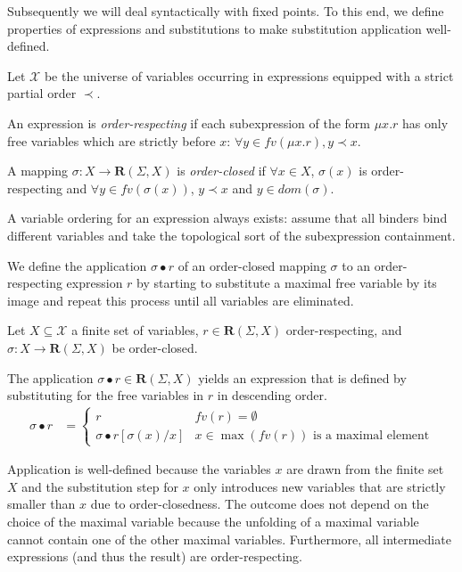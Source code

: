 \documentclass[runningheads, envcountsame, a4paper]{llncs}
\newcommand{\DOM}{{\textit{dom}}}
\newcommand\FV{{\textit{fv}}}
\newcommand\X{\mathcal{X}}
\newcommand\Reg{\mathbf{R}}
\newcommand\ApplySubst[2]{#1 \bullet #2} %
\begin{document}
Subsequently we will deal syntactically with fixed points. To this end,
we define properties of expressions and substitutions to make
substitution application well-defined.

\begin{definition}
  Let $\X$ be the universe of variables occurring in expressions
  equipped with a strict partial order $\prec$.

  An expression is \emph{order-respecting} if each subexpression
  of the form $\mu x.r$ has only free variables which are strictly before
  $x$: $\forall y\in\FV (\mu x.r), y \prec x$.

  A mapping $\sigma: X \to \Reg (\Sigma, X)$ is \emph{order-closed}
  if $\forall x\in X$, $\sigma (x)$ is order-respecting and
  $\forall y \in \FV(\sigma (x))$, $y\prec x$ and $y\in\DOM
  (\sigma)$. 
\end{definition}
A variable ordering for an expression always exists: assume that all
binders bind different variables and take the topological
sort of the subexpression containment.

We define the application $\ApplySubst\sigma r$ of an order-closed
mapping $\sigma$ to an order-respecting expression $r$ by starting 
to substitute a maximal free variable by its image and repeat this
process until all variables are eliminated.
\begin{definition}
  Let $X \subseteq \X$ a finite set of variables, $r \in \Reg (\Sigma,
  X)$ order-respecting, and $\sigma : X \to
  \Reg (\Sigma, X)$ be order-closed.

  The application $\ApplySubst \sigma r \in 
  \Reg (\Sigma, X)$ yields an expression that is
  defined by substituting for the free variables in $r$ in descending order.
  \begin{align*}
    \ApplySubst \sigma r &=
                           \begin{cases}
                             r & \FV (r) = \emptyset \\
                             \ApplySubst\sigma{r[\sigma(x)/x]}& x \in \max (\FV (r)) \text{ is a
                               maximal element}
                           \end{cases}
  \end{align*}
\end{definition}
Application is well-defined because the variables $x$ are drawn from
the finite set $X$ and the substitution step for $x$ only introduces
new variables that are strictly smaller than $x$ due to
order-closedness.
The outcome does not depend on the choice of the maximal variable
because the unfolding of a maximal variable cannot contain one of the other
maximal variables. 
Furthermore, all intermediate expressions (and thus the result) are order-respecting.
\end{document}
